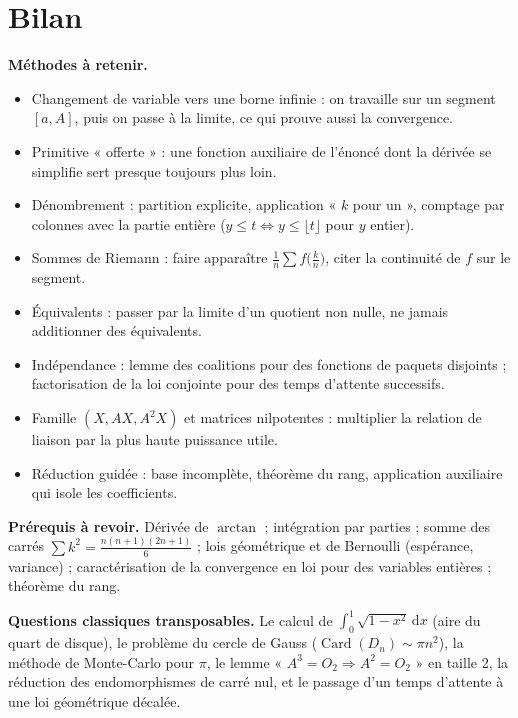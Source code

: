 \documentclass[11pt,a4paper]{article}
\providecommand{\tightlist}{\setlength{\itemsep}{0pt}\setlength{\parskip}{0pt}}
\begin{document}
\hypertarget{bilan}{%
\section{Bilan}\label{bilan}}

\textbf{Méthodes à retenir.}

\begin{itemize}
\tightlist
\item
  Changement de variable vers une borne infinie : on travaille sur un segment \([a,A]\), puis on passe à la limite, ce qui prouve aussi la convergence.
\item
  Primitive « offerte » : une fonction auxiliaire de l'énoncé dont la dérivée se simplifie sert presque toujours plus loin.
\item
  Dénombrement : partition explicite, application « \(k\) pour un », comptage par colonnes avec la partie entière (\(y\leqslant t\iff y\leqslant\lfloor t\rfloor\) pour \(y\) entier).
\item
  Sommes de Riemann : faire apparaître \(\frac1n\sum f\big(\frac kn\big)\), citer la continuité de \(f\) sur le segment.
\item
  Équivalents : passer par la limite d'un quotient non nulle, ne jamais additionner des équivalents.
\item
  Indépendance : lemme des coalitions pour des fonctions de paquets disjoints ; factorisation de la loi conjointe pour des temps d'attente successifs.
\item
  Famille \((X,AX,A^2X)\) et matrices nilpotentes : multiplier la relation de liaison par la plus haute puissance utile.
\item
  Réduction guidée : base incomplète, théorème du rang, application auxiliaire qui isole les coefficients.
\end{itemize}

\textbf{Prérequis à revoir.} Dérivée de \(\arctan\) ; intégration par parties ; somme des carrés \(\sum k^2=\frac{n(n+1)(2n+1)}6\) ; lois géométrique et de Bernoulli (espérance, variance) ; caractérisation de la convergence en loi pour des variables entières ; théorème du rang.

\textbf{Questions classiques transposables.} Le calcul de \(\int_0^1\sqrt{1-x^2}\,\mathrm dx\) (aire du quart de disque), le problème du cercle de Gauss (\(\operatorname{Card}(D_n)\sim\pi n^2\)), la méthode de Monte-Carlo pour \(\pi\), le lemme « \(A^3=O_2\Rightarrow A^2=O_2\) » en taille 2, la réduction des endomorphismes de carré nul, et le passage d'un temps d'attente à une loi géométrique décalée.
\end{document}
